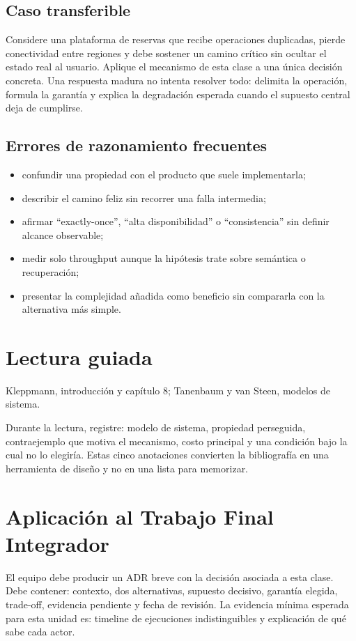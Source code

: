 \documentclass[variant=apuntes,cover=institutional,mode=screen]{ua-engineering-v6-article}
\begin{document}
\subsection{Caso transferible}
Considere una plataforma de reservas que recibe operaciones duplicadas, pierde conectividad entre regiones y debe sostener un camino crítico sin ocultar el estado real al usuario. Aplique el mecanismo de esta clase a una única decisión concreta. Una respuesta madura no intenta resolver todo: delimita la operación, formula la garantía y explica la degradación esperada cuando el supuesto central deja de cumplirse.

\subsection{Errores de razonamiento frecuentes}
\begin{itemize}
\item confundir una propiedad con el producto que suele implementarla;
\item describir el camino feliz sin recorrer una falla intermedia;
\item afirmar ``exactly-once'', ``alta disponibilidad'' o ``consistencia'' sin definir alcance observable;
\item medir solo throughput aunque la hipótesis trate sobre semántica o recuperación;
\item presentar la complejidad añadida como beneficio sin compararla con la alternativa más simple.
\end{itemize}

\section{Lectura guiada}
Kleppmann, introducción y capítulo 8; Tanenbaum y van Steen, modelos de sistema.

Durante la lectura, registre: modelo de sistema, propiedad perseguida, contraejemplo que motiva el mecanismo, costo principal y una condición bajo la cual no lo elegiría. Estas cinco anotaciones convierten la bibliografía en una herramienta de diseño y no en una lista para memorizar.

\section{Aplicación al Trabajo Final Integrador}
El equipo debe producir un ADR breve con la decisión asociada a esta clase. Debe contener: contexto, dos alternativas, supuesto decisivo, garantía elegida, trade-off, evidencia pendiente y fecha de revisión. La evidencia mínima esperada para esta unidad es: timeline de ejecuciones indistinguibles y explicación de qué sabe cada actor.
\end{document}
